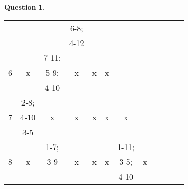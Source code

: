 \documentclass[11pt,a4paper]{article}
\theoremstyle{definition}%
\newtheorem{Q}{Question}[] %
\begin{document}
\begin{Q}
{\begin{center}
\begin{tabular}{|c|c|c|c|c|c|c|c|c|c|c|c|}
				 &  &  & \cellcolor{red!25}6-8; &  & \cellcolor{gray!20} &  \cellcolor{gray!20}&  \cellcolor{gray!20}& \cellcolor{gray!20} & \cellcolor{gray!20} & \cellcolor{gray!20} & \cellcolor{gray!20}\\
				 &  &  & \cellcolor{red!25}4-12 &  & \cellcolor{gray!20} &  \cellcolor{gray!20}& \cellcolor{gray!20} & \cellcolor{gray!20} & \cellcolor{gray!20} & \cellcolor{gray!20} & \cellcolor{gray!20}\\ \hline
				\multirow{3}{*}{6} & \multirow{3}{*}{x} & \cellcolor{green!25}7-11; & \multirow{3}{*}{x} & \multirow{3}{*}{x} & \multirow{3}{*}{x} & \cellcolor{gray!20} &\cellcolor{gray!20}  & \cellcolor{gray!20} & \cellcolor{gray!20} & \cellcolor{gray!20} & \cellcolor{gray!20}\\
				 &  & \cellcolor{green!25}5-9; &  &  &  & \cellcolor{gray!20} &  \cellcolor{gray!20}&  \cellcolor{gray!20}& \cellcolor{gray!20} & \cellcolor{gray!20} & \cellcolor{gray!20}\\
				 &  & \cellcolor{green!25}4-10 &  &  &  & \cellcolor{gray!20} & \cellcolor{gray!20} &\cellcolor{gray!20}  & \cellcolor{gray!20} & \cellcolor{gray!20} &\cellcolor{gray!20}\\ \hline
				\multirow{3}{*}{7} & \cellcolor{red!25}2-8; & \multirow{3}{*}{x} & \multirow{3}{*}{x} & \multirow{3}{*}{x} & \multirow{3}{*}{x} & \multirow{3}{*}{x} & \cellcolor{gray!20} &  \cellcolor{gray!20}&  \cellcolor{gray!20}& \cellcolor{gray!20} & \cellcolor{gray!20}\\
				 & \cellcolor{red!25}4-10 &  & & &  &  & \cellcolor{gray!20} & \cellcolor{gray!20} & \cellcolor{gray!20} & \cellcolor{gray!20} & \cellcolor{gray!20}\\
				 & \cellcolor{red!25}3-5 & & & &  &  & \cellcolor{gray!20} &\cellcolor{gray!20}  & \cellcolor{gray!20} & \cellcolor{gray!20} &\cellcolor{gray!20} \\ \hline
				\multirow{3}{*}{8} & \multirow{3}{*}{x}  & \cellcolor{red!25}1-7; & \multirow{3}{*}{x}  & \multirow{3}{*}{x}  & \multirow{3}{*}{x}  & \cellcolor{red!25}1-11; & \multirow{3}{*}{x}  & \cellcolor{gray!20} &  \cellcolor{gray!20}& \cellcolor{gray!20} & \cellcolor{gray!20}\\
				& x & \cellcolor{red!25}3-9 & & & & \cellcolor{red!25}3-5; & & \cellcolor{gray!20} &\cellcolor{gray!20}  & \cellcolor{gray!20} & \cellcolor{gray!20}\\
				&  & \cellcolor{red!25} & & & & \cellcolor{red!25}4-10 & &  \cellcolor{gray!20}& \cellcolor{gray!20} &  \cellcolor{gray!20}& \cellcolor{gray!20}\\ \hline

\end{tabular}
\end{center}}
\end{Q}
\end{document}

